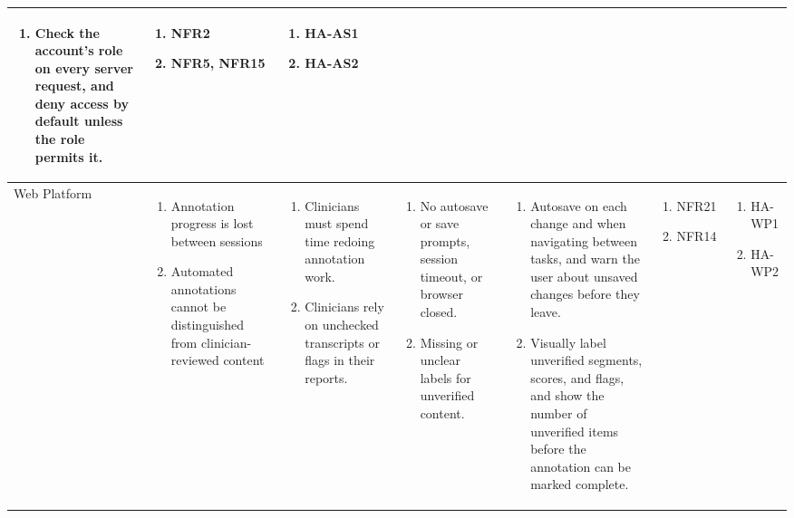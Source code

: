 \documentclass{article}
\begin{document}
\begin{landscape}
\begin{longtable}{|p{2.4cm}|p{3.2cm}|p{4cm}|p{3.6cm}|p{4.8cm}|p{1.8cm}|p{2.2cm}|}
\begin{enumerate}[leftmargin=*]
       \item Check the account's role on every server request, and deny access by default unless the role permits it.
  \end{enumerate} &
  \begin{enumerate}[leftmargin=*]
       \item NFR2
       \item NFR5, NFR15
  \end{enumerate} &
  \begin{enumerate}[leftmargin=*]
       \item HA-AS1
       \item HA-AS2
  \end{enumerate} \\
  \hline
  Web Platform & 
  \begin{enumerate}[leftmargin=*]
      \item Annotation progress is lost between sessions
      \item Automated annotations cannot be distinguished from clinician-reviewed content
  \end{enumerate} & 
  \begin{enumerate}[leftmargin=*]
      \item Clinicians must spend time redoing annotation work.
      \item Clinicians rely on unchecked transcripts or flags in their reports.
  \end{enumerate} &
  \begin{enumerate}[leftmargin=*]
       \item No autosave or save prompts, session timeout, or browser closed.
       \item Missing or unclear labels for unverified content.
  \end{enumerate} &
  \begin{enumerate}[leftmargin=*]
       \item Autosave on each change and when navigating between tasks, and warn the user about unsaved changes before they leave.
       \item Visually label unverified segments, scores, and flags, and show the number of unverified items before the annotation can be marked complete.
  \end{enumerate} &
  \begin{enumerate}[leftmargin=*]
       \item NFR21
       \item NFR14
  \end{enumerate} &
  \begin{enumerate}[leftmargin=*]
       \item HA-WP1
       \item HA-WP2
  \end{enumerate} \\
  \hline
  \end{longtable}
\end{landscape}
\restoregeometry
\newpage
\end{document}
